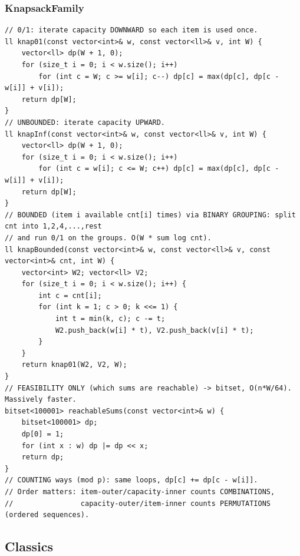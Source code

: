 \documentclass[9pt,a4paper,twocolumn]{extarticle}
\begin{document}
\subsubsection{KnapsackFamily}
\nopagebreak
\begin{lstlisting}
// 0/1: iterate capacity DOWNWARD so each item is used once.
ll knap01(const vector<int>& w, const vector<ll>& v, int W) {
    vector<ll> dp(W + 1, 0);
    for (size_t i = 0; i < w.size(); i++)
        for (int c = W; c >= w[i]; c--) dp[c] = max(dp[c], dp[c - w[i]] + v[i]);
    return dp[W];
}
// UNBOUNDED: iterate capacity UPWARD.
ll knapInf(const vector<int>& w, const vector<ll>& v, int W) {
    vector<ll> dp(W + 1, 0);
    for (size_t i = 0; i < w.size(); i++)
        for (int c = w[i]; c <= W; c++) dp[c] = max(dp[c], dp[c - w[i]] + v[i]);
    return dp[W];
}
// BOUNDED (item i available cnt[i] times) via BINARY GROUPING: split cnt into 1,2,4,...,rest
// and run 0/1 on the groups. O(W * sum log cnt).
ll knapBounded(const vector<int>& w, const vector<ll>& v, const vector<int>& cnt, int W) {
    vector<int> W2; vector<ll> V2;
    for (size_t i = 0; i < w.size(); i++) {
        int c = cnt[i];
        for (int k = 1; c > 0; k <<= 1) {
            int t = min(k, c); c -= t;
            W2.push_back(w[i] * t), V2.push_back(v[i] * t);
        }
    }
    return knap01(W2, V2, W);
}
// FEASIBILITY ONLY (which sums are reachable) -> bitset, O(n*W/64). Massively faster.
bitset<100001> reachableSums(const vector<int>& w) {
    bitset<100001> dp;
    dp[0] = 1;
    for (int x : w) dp |= dp << x;
    return dp;
}
// COUNTING ways (mod p): same loops, dp[c] += dp[c - w[i]].
// Order matters: item-outer/capacity-inner counts COMBINATIONS,
//                capacity-outer/item-inner counts PERMUTATIONS (ordered sequences).
\end{lstlisting}

\subsection{Classics}

\filbreak
\end{document}
